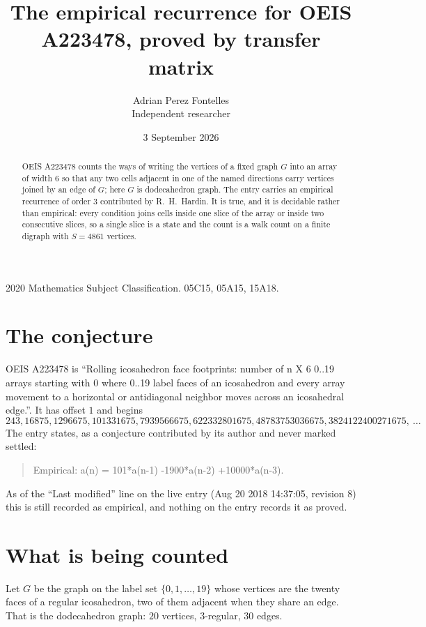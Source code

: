\documentclass[11pt,a4paper]{article}
\title{The empirical recurrence for OEIS A223478, proved by transfer matrix}
\author{Adrian Perez Fontelles\\ \small Independent researcher}
\date{3 September 2026}
\theoremstyle{plain}
\theoremstyle{definition}
\begin{document}
\maketitle

\begin{abstract}
OEIS A223478 counts the ways of writing the vertices of a fixed graph $G$ into an array of width
$6$ so that any two cells adjacent in one of the named directions carry vertices joined by an
edge of $G$; here $G$ is dodecahedron graph. The entry carries an empirical recurrence of order $3$
contributed by R.~H.~Hardin. It is true, and it is decidable rather than empirical: every
condition joins cells inside one slice of the array or inside two consecutive slices, so a
single slice is a state and the count is a walk count on a finite digraph with $S=4861$ vertices.
\end{abstract}

\noindent\small 2020 Mathematics Subject Classification. 05C15, 05A15, 15A18.\normalsize

\section{The conjecture}

OEIS A223478 is ``Rolling icosahedron face footprints: number of n X 6 0..19 arrays starting with 0 where 0..19 label faces of an icosahedron and every array movement to a horizontal or antidiagonal neighbor moves across an icosahedral edge.''. It has offset $1$ and begins
\[
243, 16875, 1296675, 101331675, 7939566675, 622332801675, 48783753036675, 3824122400271675,\ \dots
\]
The entry states, as a conjecture contributed by its author and never marked settled:
\begin{quote}
Empirical: a(n) = 101*a(n-1) -1900*a(n-2) +10000*a(n-3).
\end{quote}
As of the ``Last modified'' line on the live entry (Aug 20 2018 14:37:05, revision 8) this is still
recorded as empirical, and nothing on the entry records it as proved.

\section{What is being counted}

Let $G$ be the graph on the label set $\{0,1,\dots,19\}$ whose vertices are the twenty faces of a regular icosahedron, two of them adjacent when they share an edge. That is the dodecahedron graph: $20$ vertices, $3$-regular, $30$ edges.
\end{document}
